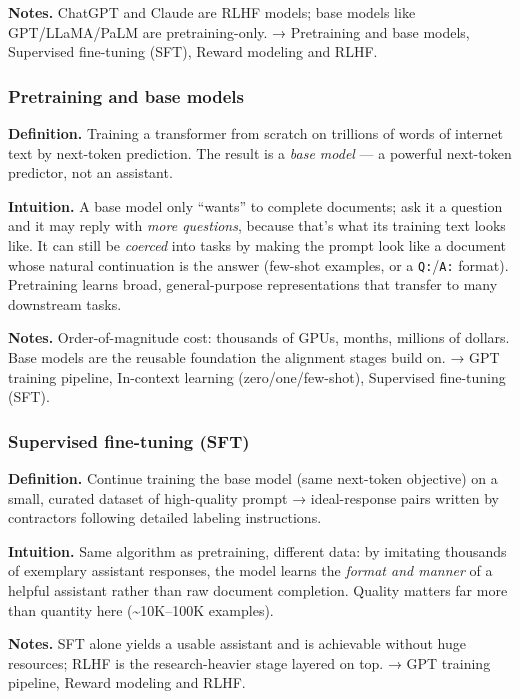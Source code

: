 \documentclass[
  10pt,
  letterpaper,
  onecolumn]{article}
\begin{document}
\textbf{Notes.} ChatGPT and Claude are RLHF models; base models like
GPT/LLaMA/PaLM are pretraining-only. → Pretraining and base models,
Supervised fine-tuning (SFT), Reward modeling and RLHF.

\hypertarget{pretraining-and-base-models}{%
\subsubsection{Pretraining and base
models}\label{pretraining-and-base-models}}

\textbf{Definition.} Training a transformer from scratch on trillions of
words of internet text by next-token prediction. The result is a
\emph{base model} --- a powerful next-token predictor, not an assistant.

\textbf{Intuition.} A base model only ``wants'' to complete documents;
ask it a question and it may reply with \emph{more questions}, because
that's what its training text looks like. It can still be \emph{coerced}
into tasks by making the prompt look like a document whose natural
continuation is the answer (few-shot examples, or a
\texttt{Q:}/\texttt{A:} format). Pretraining learns broad,
general-purpose representations that transfer to many downstream tasks.

\textbf{Notes.} Order-of-magnitude cost: thousands of GPUs, months,
millions of dollars. Base models are the reusable foundation the
alignment stages build on. → GPT training pipeline, In-context learning
(zero/one/few-shot), Supervised fine-tuning (SFT).

\hypertarget{supervised-fine-tuning-sft}{%
\subsubsection{Supervised fine-tuning
(SFT)}\label{supervised-fine-tuning-sft}}

\textbf{Definition.} Continue training the base model (same next-token
objective) on a small, curated dataset of high-quality prompt →
ideal-response pairs written by contractors following detailed labeling
instructions.

\textbf{Intuition.} Same algorithm as pretraining, different data: by
imitating thousands of exemplary assistant responses, the model learns
the \emph{format and manner} of a helpful assistant rather than raw
document completion. Quality matters far more than quantity here
(\textasciitilde10K--100K examples).

\textbf{Notes.} SFT alone yields a usable assistant and is achievable
without huge resources; RLHF is the research-heavier stage layered on
top. → GPT training pipeline, Reward modeling and RLHF.
\end{document}
